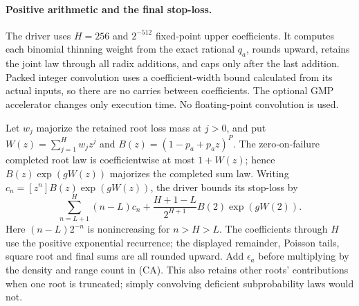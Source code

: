 \documentclass[11pt]{article}
\theoremstyle{definition}
\theoremstyle{remark}
\begin{document}
\paragraph{Positive arithmetic and the final stop-loss.}
The driver  uses $H=256$ and
$2^{-512}$ fixed-point upper coefficients. It computes each binomial
thinning weight from the exact rational $q_a$, rounds upward, retains the
joint law through all radix additions, and caps only after the last
addition. Packed integer convolution uses a coefficient-width bound
calculated from its actual inputs, so there are no carries between
coefficients. The optional GMP accelerator changes only execution time.
No floating-point convolution is used.

Let $w_j$ majorize the retained root loss mass at $j>0$, and put
$W(z)=\sum_{j=1}^H w_jz^j$ and $B(z)=(1-p_a+p_az)^P$.
The zero-on-failure completed root law is coefficientwise at most
$1+W(z)$; hence $B(z)\exp(gW(z))$ majorizes the completed sum law.
Writing $c_n=[z^n]B(z)\exp(gW(z))$, the driver bounds its stop-loss by
\[
 \sum_{n=L+1}^H(n-L)c_n+
 \frac{H+1-L}{2^{H+1}}B(2)\exp(gW(2)).
\]
Here $(n-L)2^{-n}$ is nonincreasing for $n>H>L$. The coefficients through
$H$ use the positive exponential recurrence; the displayed remainder,
Poisson tails, square root and final sums are all rounded upward.
Add $\epsilon_a$ before multiplying by the density and range count in
(CA). This also retains other roots' contributions when one root is
truncated; simply convolving deficient subprobability laws would not.
\end{document}
